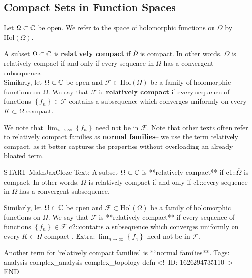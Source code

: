 \documentclass{memoir}
\begin{document}
\subsection{Compact Sets in Function Spaces}
\label{sub:compact_sets_in_function_spaces}

Let \(\Omega \subset \mathbb{C}\) be open. We refer to the space of holomorphic functions on \(\Omega \) by \(\textrm{Hol}(\Omega )\).

\begin{defn}
	A subset \(\Omega \subset \mathbb{C}\) is \textbf{relatively compact} if \(\overline{\Omega }\) is compact. In other words, \(\Omega \) is relatively compact if and only if every sequence in \(\Omega \) has a convergent subsequence.\\

	Similarly, let \(\Omega \subset \mathbb{C}\) be open and \(\mathcal{F}\subset \textrm{Hol}(\Omega )\) be a family of holomorphic functions on \(\Omega \). We say that \(\mathcal{F}\) is \textbf{relatively compact} if every sequence of functions \(\left\{ f_n \right\} \in \mathcal{F}\) contains a subsequence which converges uniformly on every \(K\subset \Omega \) compact.
\end{defn}
We note that \(\lim_{n \to \infty} \left\{ f_n \right\} \) need not be in \(\mathcal{F}\). Note that other texts often refer to relatively compact families as \textbf{normal families}-- we use the term relatively compact, as it better captures the properties without overloading an already bloated term.

\begin{anki}
START
MathJaxCloze
Text: A subset \(\Omega \subset \mathbb{C}\) is **relatively compact** if {{c1::\(\overline{\Omega }\) is compact}}. In other words, \(\Omega \) is relatively compact if and only if {{c1::every sequence in \(\Omega \) has a convergent subsequence}}.

Similarly, let \(\Omega \subset \mathbb{C}\) be open and \(\mathcal{F}\subset \textrm{Hol}(\Omega )\) be a family of holomorphic functions on \(\Omega \). We say that \(\mathcal{F}\) is **relatively compact** if every sequence of functions \(\left\{ f_n \right\} \in \mathcal{F}\) {{c2::contains a subsequence which converges uniformly on every \(K\subset \Omega \) compact}} .
Extra: \(\lim_{n \to \infty} \left\{ f_n \right\} \) need not be in \(\mathcal{F}\).

Another term for 'relatively compact families' is **normal families**.
Tags: analysis complex_analysis complex_topology defn
<!--ID: 1626294735110-->
END
\end{anki}
\end{document}

